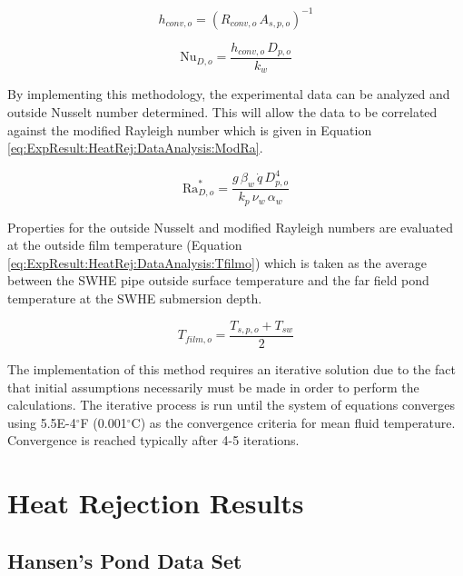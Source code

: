 	\begin{equation}
		h_{conv,o}=(R_{conv,o} \, A_{s,p,o})^{-1}
		\label{eq:ExpResult:HeatRej:DataAnalysis:OutsideConvCoeff}
	\end{equation}

	\begin{equation}
		\mbox{Nu}_{D,o} = \frac{h_{conv,o} \, D_{p,o}}{k_{w}}
		\label{eq:ExpResult:HeatRej:DataAnalysis:ExpOutsideNusselt}
	\end{equation}

By implementing this methodology, the experimental data can be analyzed and outside Nusselt number determined. This will allow the data to be correlated against the modified Rayleigh number \citep{ChurchillChu1975} which is given in Equation \ref{eq:ExpResult:HeatRej:DataAnalysis:ModRa}.
 
	\begin{equation}
		\mbox{Ra}_{D,o}^* = \frac{g \, \beta_w \, \dot{q} \, D_{p,o}^4}{k_p \, \nu_w \, \alpha_w}
		\label{eq:ExpResult:HeatRej:DataAnalysis:ModRa}
	\end{equation}
	
Properties for the outside Nusselt and modified Rayleigh numbers are evaluated at the outside film temperature (Equation \ref{eq:ExpResult:HeatRej:DataAnalysis:Tfilmo}) which is taken as the average between the SWHE pipe outside surface temperature and the far field pond temperature at the SWHE submersion depth.

	\begin{equation}
		T_{film,o} = \frac{T_{s,p,o} + T_{sw}}{2}
		\label{eq:ExpResult:HeatRej:DataAnalysis:Tfilmo}
	\end{equation}
	
The implementation of this method requires an iterative solution due to the fact that initial assumptions necessarily must be made in order to perform the calculations.  The iterative process is run until the system of equations converges using 5.5E-4$^\circ$F (0.001$^\circ$C) as the convergence criteria for mean fluid temperature. Convergence is reached typically after 4-5 iterations.
		
\section{Heat Rejection Results}
\label{sec:ExpResult:HeatRej}

	\subsection{Hansen's Pond Data Set}
	\label{subsec:ExpResult:HeatRej:HansenData}

